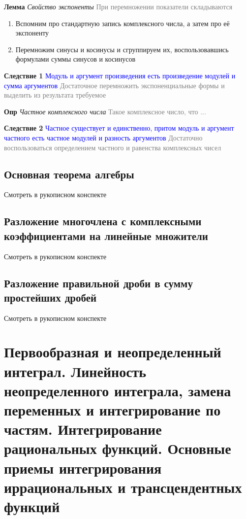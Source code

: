 \documentclass[a4paper, 14pt]{article}
\begin{document}
    \textbf{Лемма} \textit{Свойство экспоненты} \textcolor{gray}{При перемножении показатели складываются}
    
    \begin{enumerate}
        \item Вспомним про стандартную запись комплексного числа, а затем про её экспоненту
        \item Перемножим синусы и косинусы и сгруппируем их, воспользовавшись формулами суммы синусов и косинусов
    \end{enumerate}
    
    \textbf{Следствие 1}
    \textcolor{blue}{Модуль и аргумент произведения есть произведение модулей и сумма аргументов}
    \textcolor{gray}{Достаточное перемножить экспоненциальные формы и выделить из результата требуемое}
    
    \textbf{Опр} \textit{Частное комплексного числа} \textcolor{gray}{Такое комплексное число, что ...}
    
    \textbf{Следствие 2}
    \textcolor{blue}{Частное существует и единственно, притом модуль и аргумент частного есть частное модулей и
    разность аргументов}
    \textcolor{gray}{Достаточно воспользоваться определением частного и равенства комплексных чисел}
    
    \subsection{Основная теорема алгебры}
    
    Смотреть в рукописном конспекте
    
    \subsection{Разложение многочлена с комплексными коэффициентами на линейные множители}
    
    Смотреть в рукописном конспекте
    
    \subsection{Разложение правильной дроби в сумму простейших дробей}
    
    Смотреть в рукописном конспекте
    
    \section{Первообразная и неопределенный интеграл.
    Линейность неопределенного интеграла, замена переменных и интегрирование по частям.
    Интегрирование рациональных функций.
    Основные приемы интегрирования иррациональных и трансцендентных функций}
\end{document}

